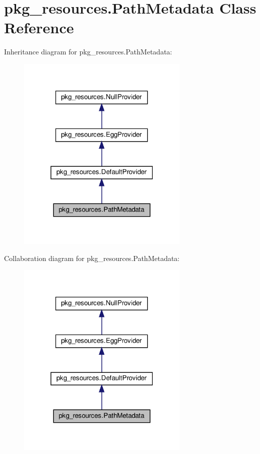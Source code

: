 \hypertarget{classpkg__resources_1_1PathMetadata}{}\section{pkg\+\_\+resources.\+Path\+Metadata Class Reference}
\label{classpkg__resources_1_1PathMetadata}


Inheritance diagram for pkg\+\_\+resources.\+Path\+Metadata\+:
\nopagebreak
\begin{figure}[H]
\begin{center}
\leavevmode
\includegraphics[width=231pt]{classpkg__resources_1_1PathMetadata__inherit__graph}
\end{center}
\end{figure}


Collaboration diagram for pkg\+\_\+resources.\+Path\+Metadata\+:
\nopagebreak
\begin{figure}[H]
\begin{center}
\leavevmode
\includegraphics[width=231pt]{classpkg__resources_1_1PathMetadata__coll__graph}
\end{center}
\end{figure}
